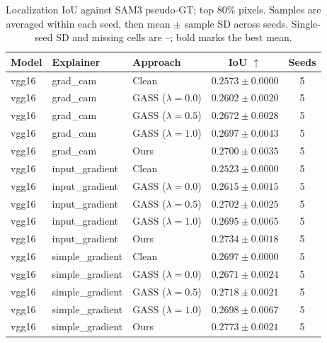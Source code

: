 \begin{table}[t]
\centering
\caption{Localization IoU against SAM3 pseudo-GT; top 80\% pixels. Samples are averaged within each seed, then mean $\pm$ sample SD across seeds. Single-seed SD and missing cells are --; bold marks the best mean.}
\begin{tabular}{lllcc}
\hline
Model & Explainer & Approach & IoU $\uparrow$ & Seeds \\
\hline
vgg16 & grad\_cam & Clean & $0.2573 \pm 0.0000$ & 5 \\
vgg16 & grad\_cam & GASS ($\lambda=0.0$) & $0.2602 \pm 0.0020$ & 5 \\
vgg16 & grad\_cam & GASS ($\lambda=0.5$) & $0.2672 \pm 0.0028$ & 5 \\
vgg16 & grad\_cam & GASS ($\lambda=1.0$) & $0.2697 \pm 0.0043$ & 5 \\
vgg16 & grad\_cam & Ours & $\mathbf{0.2700 \pm 0.0035}$ & 5 \\
\hline
vgg16 & input\_gradient & Clean & $0.2523 \pm 0.0000$ & 5 \\
vgg16 & input\_gradient & GASS ($\lambda=0.0$) & $0.2615 \pm 0.0015$ & 5 \\
vgg16 & input\_gradient & GASS ($\lambda=0.5$) & $0.2702 \pm 0.0025$ & 5 \\
vgg16 & input\_gradient & GASS ($\lambda=1.0$) & $0.2695 \pm 0.0065$ & 5 \\
vgg16 & input\_gradient & Ours & $\mathbf{0.2734 \pm 0.0018}$ & 5 \\
\hline
vgg16 & simple\_gradient & Clean & $0.2697 \pm 0.0000$ & 5 \\
vgg16 & simple\_gradient & GASS ($\lambda=0.0$) & $0.2671 \pm 0.0024$ & 5 \\
vgg16 & simple\_gradient & GASS ($\lambda=0.5$) & $0.2718 \pm 0.0021$ & 5 \\
vgg16 & simple\_gradient & GASS ($\lambda=1.0$) & $0.2698 \pm 0.0067$ & 5 \\
vgg16 & simple\_gradient & Ours & $\mathbf{0.2773 \pm 0.0021}$ & 5 \\
\hline
\end{tabular}
\end{table}
